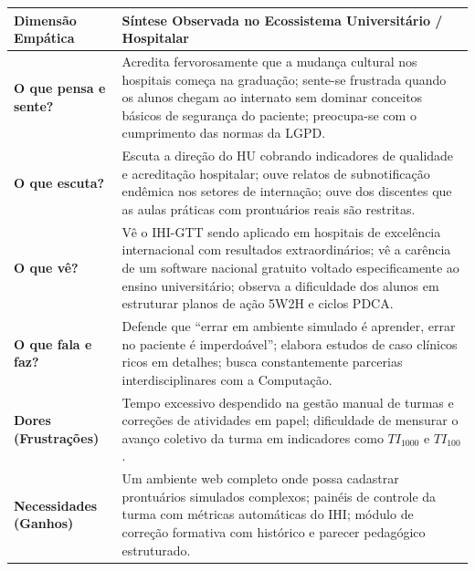 \begin{quadro}[htb]
\centering
\small
\caption{Mapa de Empatia - Persona 2: Prof.ª Dr.ª Waleska Patrício (Docente da Saúde).}
\label{qua_empatia_waleska}
\begin{tabularx}{\textwidth}{p{3.8cm} X}
\toprule
\textbf{Dimensão Empática} & \textbf{Síntese Observada no Ecossistema Universitário / Hospitalar} \\
\midrule
\textbf{O que pensa e sente?} & Acredita fervorosamente que a mudança cultural nos hospitais começa na graduação; sente-se frustrada quando os alunos chegam ao internato sem dominar conceitos básicos de segurança do paciente; preocupa-se com o cumprimento das normas da LGPD. \\
\midrule
\textbf{O que escuta?} & Escuta a direção do HU cobrando indicadores de qualidade e acreditação hospitalar; ouve relatos de subnotificação endêmica nos setores de internação; ouve dos discentes que as aulas práticas com prontuários reais são restritas. \\
\midrule
\textbf{O que vê?} & Vê o IHI-GTT sendo aplicado em hospitais de excelência internacional com resultados extraordinários; vê a carência de um software nacional gratuito voltado especificamente ao ensino universitário; observa a dificuldade dos alunos em estruturar planos de ação 5W2H e ciclos PDCA. \\
\midrule
\textbf{O que fala e faz?} & Defende que ``errar em ambiente simulado é aprender, errar no paciente é imperdoável''; elabora estudos de caso clínicos ricos em detalhes; busca constantemente parcerias interdisciplinares com a Computação. \\
\midrule
\textbf{Dores (Frustrações)} & Tempo excessivo despendido na gestão manual de turmas e correções de atividades em papel; dificuldade de mensurar o avanço coletivo da turma em indicadores como $TI_{1000}$ e $TI_{100}$. \\
\midrule
\textbf{Necessidades (Ganhos)} & Um ambiente web completo onde possa cadastrar prontuários simulados complexos; painéis de controle da turma com métricas automáticas do IHI; módulo de correção formativa com histórico e parecer pedagógico estruturado. \\
\bottomrule
\end{tabularx}
\end{quadro}

